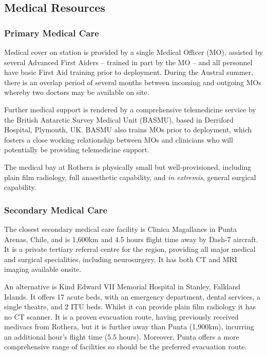 \documentclass[12pt,a4paper]{article}
\begin{document}
\subsection{Medical Resources}

\subsubsection{Primary Medical Care}

Medical cover on station is provided by a single Medical Officer (MO), assisted by several Advanced First Aiders -- trained in part by the MO -- and all personnel have basic First Aid training prior to deployment. During the Austral summer, there is an overlap period of several months between incoming and outgoing MOs whereby two doctors may be available on site.

Further medical support is rendered by a comprehensive telemedicine service by the British Antarctic Survey Medical Unit (BASMU), based in Derriford Hospital, Plymouth, UK. BASMU also trains MOs prior to deployment, which fosters a close working relationship between MOs and clinicians who will potentially be providing telemedicine support.

The medical bay at Rothera is physically small but well-provisioned, including plain film radiology, full anaesthetic capability, and \emph{in extremis}, general surgical capability.

\subsubsection{Secondary Medical Care}

The closest secondary medical care facility is Clinica Magallanes\cite{Anonymous:TgM8hVWD} in Punta Arenas, Chile, and is 1,600km and 4.5 hours flight time away by Dash-7 aircraft. It is a private tertiary referral centre for the region, providing all major medical and surgical specialities, including neurosurgery. It has both CT and MRI imaging available onsite.

An alternative is Kind Edward VII Memorial Hospital in Stanley, Falkland Islands. It offers 17 acute beds, with an emergency department, dental services, a single theatre, and 2 ITU beds.\cite{Anonymous:qFBtPcmx} Whilst it can provide plain film radiology it has no CT scanner. It is a proven evacuation route, having previously received medivacs from Rothera, but it is further away than Punta (1,900km), incurring an additional hour's flight time (5.5 hours). Moreover, Punta offers a more comprehensive range of facilities so should be the preferred evacuation route.
\end{document}
